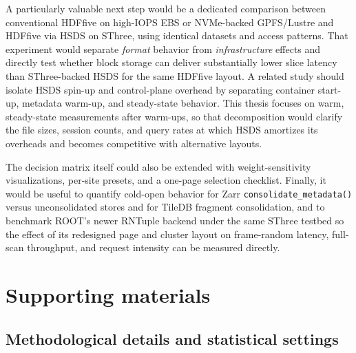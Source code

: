 \documentclass[nomenclature, english, bibtex]{kththesis}
\numberwithin{listing}{chapter}
\begin{document}
A particularly valuable next step would be a dedicated comparison between conventional \gls{HDFfive} on high-IOPS \gls{EBS} or \gls{NVMe}-backed \gls{GPFS}/Lustre and \gls{HDFfive} via \gls{HSDS} on \gls{SThree}, using identical datasets and access patterns. That experiment would separate \emph{format} behavior from \emph{infrastructure} effects and directly test whether block storage can deliver substantially lower slice latency than \gls{SThree}-backed \gls{HSDS} for the same \gls{HDFfive} layout. A related study should isolate \gls{HSDS} spin-up and control-plane overhead by separating container start-up, metadata warm-up, and steady-state behavior. This thesis focuses on warm, steady-state measurements after warm-ups, so that decomposition would clarify the file sizes, session counts, and query rates at which \gls{HSDS} amortizes its overheads and becomes competitive with alternative layouts.

The decision matrix itself could also be extended with weight-sensitivity visualizations, per-site presets, and a one-page selection checklist. Finally, it would be useful to quantify cold-open behavior for Zarr \texttt{consolidate\_metadata()} versus unconsolidated stores and for TileDB fragment consolidation, and to benchmark \gls{ROOT}'s newer \gls{RNTuple} backend under the same \gls{SThree} testbed so the effect of its redesigned page and cluster layout on frame-random latency, full-scan throughput, and request intensity can be measured directly.














\cleardoublepage
\renewcommand{\bibname}{References}


\ifbiblatex
  \printbibliography[heading=bibintoc]
\else
  
\fi



\cleardoublepage
\appendix
\renewcommand{\chaptermark}[1]{\markboth{Appendix \thechapter\relax:\thinspace\relax#1}{}}
\chapter{Supporting materials}
\label{sec:supportingMaterial}


\section{Methodological details and statistical settings}
\label{app:exec-details}
\end{document}
